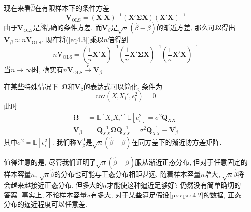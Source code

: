 \documentclass[cn, 12pt, math=mtpro2, bibstyle=apa, blue, twocol]{elegantbook}
\newcommand{\E}{\mathbb{E}}
\newcommand{\Q}{\mathbold{Q}}
\newcommand{\X}{\mathbold{X}}
\newcommand{\hb}{\hat{\beta}}
\newcommand{\V}{\mathbold{V}}
\begin{document}
现在来看$\hb$在有限样本下的条件方差
\begin{equation}\label{eq4.3}
  \V_{\text{OLS}}=(\X'\X)^{-1}(\X'\mathbold{\Sigma}\X)(\X'\X)^{-1}
\end{equation}
由于$\V_{\text{OLS}}$是$\hb$精确的条件方差, 而$\V_\beta$是$\sqrt{n}(\hb-\beta)$的渐近方差, 那么可以得出$\V_{\beta}\approx n\V_{\text{OLS}}$. 现在将(\ref{eq4.3})乘以$n$倍得到
$$n\V_{\text{OLS}}=\left(\frac{1}{n}\X'\X\right)^{-1}\left(\frac{1}{n}\X'\mathbold{\Sigma}\X\right)^{-1}\left(\frac{1}{n}\X'\X\right)^{-1}$$
当$n\to\infty$时, 确实有$n\V_{\text{OLS}}\xrightarrow{p}\V_\beta$.

在某些特殊情况下, $\mathbold{\Omega}$和$\V_\beta$的表达式可以简化, 条件为
\begin{equation}\label{eq4.4}
  \text{cov}(X_iX_i',e_i^2)=0
\end{equation}
此时
\begin{align*}
\mathbold{\Omega}&=\E[X_iX_i']\E[e_i^2]=\sigma^2\Q_{XX} \\
\V_\beta&=\Q_{XX}^{-1}\mathbold{\Omega}\Q_{XX}^{-1}=\sigma^2\Q_{XX}^{-1}\equiv \V_\beta^0
\end{align*}
其中$\sigma^2=\E[e_i^2]$. 我们称$\V_\beta^0$是$\sqrt{n}(\hb-\beta)$在同方差下的渐近协方差矩阵.

值得注意的是, 尽管我们证明了$\sqrt{n}(\hb-\beta)$服从渐近正态分布, 但对于任意固定的样本容量$n$, $\sqrt{n}\hb$的分布也可能与正态分布相距甚远. 随着样本容量$n$增大, $\sqrt{n}\hb$将会越来越接近正态分布, 但多大的$n$才能使这种逼近足够好? 仍然没有简单确切的答案. 事实上, 不论样本容量$n$有多大, 对于某些满足假设\ref{pro:pro4.2}的数据, 正态分布的逼近程度可以任意差.
\end{document}
